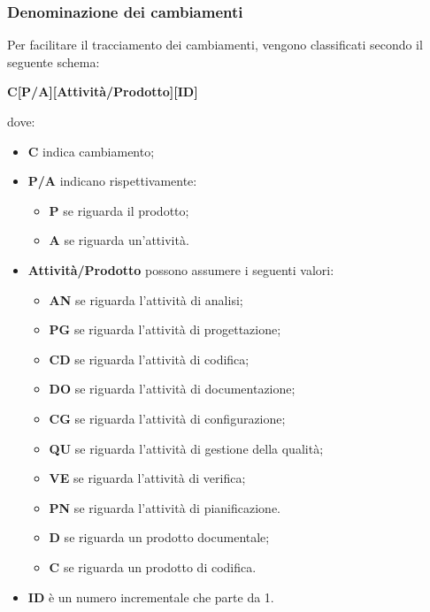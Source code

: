 \subsubsection{Denominazione dei cambiamenti}\label{NomeCambiamenti}
Per facilitare il tracciamento dei cambiamenti, vengono classificati secondo il seguente schema:
\begin{center}
	\textbf{C[P/A][Attività/Prodotto][ID]}
\end{center} 
dove:
\begin{itemize}
	\item \textbf{C} indica cambiamento;
	\item \textbf{P/A} indicano rispettivamente:
	\begin{itemize}
		\item \textbf{P} se riguarda il prodotto;
		\item \textbf{A} se riguarda un'attività.
	\end{itemize}
	\item \textbf{Attività/Prodotto} possono assumere i seguenti valori:
	\begin{itemize}
			\item \textbf{AN} se riguarda l'attività di analisi;
			\item \textbf{PG} se riguarda l'attività di progettazione;
			\item \textbf{CD} se riguarda l'attività di codifica;
			\item \textbf{DO} se riguarda l'attività di documentazione;
			\item \textbf{CG} se riguarda l'attività di configurazione;
			\item \textbf{QU} se riguarda l'attività di gestione della qualità;
			\item \textbf{VE} se riguarda l'attività di verifica;
			\item \textbf{PN} se riguarda l'attività di pianificazione.
			\item \textbf{D} se riguarda un prodotto documentale;
			\item \textbf{C} se riguarda un prodotto di codifica.
	\end{itemize}
	\item \textbf{ID} è un numero incrementale che parte da 1.
\end{itemize}